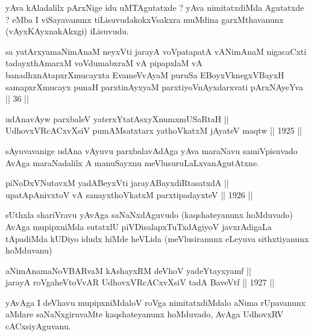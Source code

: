\begin{artha}
yAva kAladalilx pArxNige idu uMTAgutatxde ? yAva nimitatxdiMda
Agutatxde ? eMba I viSayavanunx tiLisuvudakokxVsakxra muMdina
garxMthavanunx (vAyxKAyxnakAkxgi) iLisuvudu.
\end{artha}


\begin{shl}
sa yatArxyamaNimAnaM neyxVti jarayA voVpatapatA vANimAnaM nigacaCxti tadayxthAmarxM voVdumabxraM vA pipapxlaM vA banadhxnAtapxrXmucayxta EvameVvAyaM puruSa EBoyxV\s knegxVBayxH samapxrXmucayx punaH parxtinAyxyaM parxtiyoVnAyxdarxvati pArxNAyeYva || 36 ||
\end{shl}


\begin{shl}
udAnavAyw parxbaleV yaterxYtatAsxyXnumxmUSaRtaH ||  \\
UdhovxVRcACxvXsiV pumAMsatxtarx yathoVkatxM jAyateV maqtw ||  1925 ||  
\end{shl}

\begin{artha}
sAyuvavanige udAna vAyuvu parxbalavAdAga yAva maraNavu samiVpisuvado
AvAga maraNadalilx A manuSayxnu meVlusuruLaLxvanAgutAtxne.
\end{artha}


\begin{shl}
piNoDxV\s NutavxM yadA\s BeyxVti jarayA\s BayxdiRtasatxdA || \\
upatApAnivxtoV vA sanayxthoVkatxM parxtipadayxteV ||  1926 ||  
\end{shl}

\begin{artha}
sUthxla shariVravu yAvAga saNaNxdAguvudo (kaqshateyanunx hoMduvado)
AvAga mupipxniMda sutatxlU piVDisalapxTuTxdAgiyoV javxrAdigaLa
tApadiMda kUDiyo idudx hiMde heVLida (meVlusiranunx eLeyuva
sithxtiyanunx hoMduvanu)
\end{artha}

\begin{shl}
aNimAnamaNoVBARvaM kAshayxRM deVhoV yadeYtayxyamf || \\
jarayA roVgaheVtoVvAR UdhovxVRcACxvXsiV tadA BaveVtf ||  1927 ||  
\end{shl}

\begin{artha}
yAvAga I deVhavu mupipxniMdaloV roVga nimitatxdiMdalo aNima rUpavanunx
aMdare saNaNxgiruvaMte kaqshateyanunx hoMduvado, AvAga UdhovxRV
cACxsiyAguvanu.
\end{artha}

